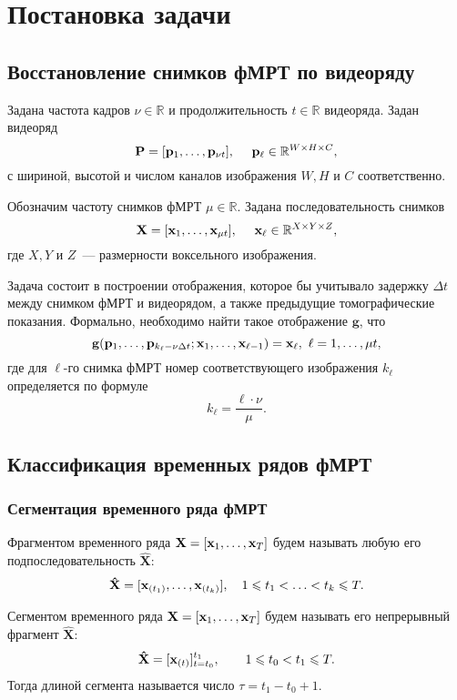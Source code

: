 \section{Постановка задачи}\label{sec1}
\subsection{Восстановление снимков фМРТ по видеоряду}
Задана частота кадров $\nu \in \mathbb{R}$ и продолжительность $t \in \mathbb{R}$ видеоряда.
Задан видеоряд
\begin{equation*}
	\label{eq1}
	\mathbf{P} = [\mathbf{p}_1, \ldots, \mathbf{p}_{\nu t}], \quad\
	\mathbf{p}_{\ell} \in \mathbb{R}^{W \times H \times C},
\end{equation*}
с шириной, высотой и числом каналов изображения $W, H$ и
$C$ соответственно.

Обозначим частоту снимков фМРТ $\mu \in \mathbb{R}$. Задана последовательность снимков
\begin{equation*}
	\label{eq2}
	\mathbf{X} = [\mathbf{x}_1, \ldots, \mathbf{x}_{\mu t}], \quad\
	\mathbf{x}_{\ell} \in \mathbb{R}^{X \times Y \times Z},
\end{equation*}
где $X, Y$ и $Z$~--- размерности воксельного изображения.

Задача состоит в построении отображения, которое бы учитывало задержку $\Delta t$ между
снимком фМРТ и видеорядом, а также предыдущие томографические показания. Формально, необходимо
найти такое отображение $\mathbf{g}$, что
\begin{equation*}
	\label{eq3}
	\mathbf{g}(\mathbf{p}_1, \ldots, \mathbf{p}_{k_{\ell} - \nu \Delta t}; \mathbf{x}_1, \ldots, \mathbf{x}_{\ell-1}) = \mathbf{x}_{\ell},
	\ \ell = 1, \ldots, \mu t,
\end{equation*}
где для $\ell$-го снимка фМРТ номер соответствующего изображения $k_{\ell}$ определяется по формуле
\begin{equation*}
	\label{eq4}
	k_{\ell} = \dfrac{\ell \cdot \nu}{\mu}.
\end{equation*}

\subsection{Классификация временных рядов фМРТ}
\subsubsection{Сегментация временного ряда фМРТ}
\begin{definition}
Фрагментом временного ряда $\mathbf{X} = [\mathbf{x}_1, \dots, \mathbf{x}_T]$ будем называть любую его подпоследовательность $\mathbf{\hat{X}}:$ $$\mathbf{\hat{X}} = [\mathbf{x}_{(t_1)}, \dots, \mathbf{x}_{(t_k)}], \quad 1 \leqslant t_1 < \ldots < t_k \leqslant T.$$
\end{definition}
\begin{definition}
Сегментом временного ряда $\mathbf{X} = [\mathbf{x}_1, \dots, \mathbf{x}_T]$ будем называть его непрерывный фрагмент $\mathbf{\hat{X}}:$
$$\mathbf{\hat{X}} = [\mathbf{x}_{(t)}]_{t=t_0}^{t_1}, \quad \quad 1 \leqslant t_0 < t_1 \leqslant T.$$
Тогда длиной сегмента называется число $\tau = t_1 - t_0 + 1$.
\end{definition}

